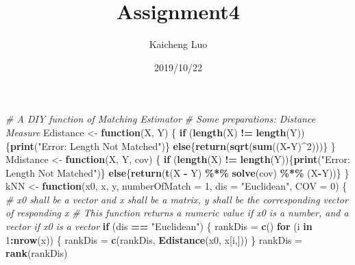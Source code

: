 \documentclass[]{article}
\title{Assignment4}
\author{Kaicheng Luo}
\date{2019/10/22}
\newenvironment{Shaded}{\begin{snugshade}}{\end{snugshade}}
\newcommand{\KeywordTok}[1]{\textcolor[rgb]{0.13,0.29,0.53}{\textbf{#1}}}
\newcommand{\DataTypeTok}[1]{\textcolor[rgb]{0.13,0.29,0.53}{#1}}
\newcommand{\DecValTok}[1]{\textcolor[rgb]{0.00,0.00,0.81}{#1}}
\newcommand{\StringTok}[1]{\textcolor[rgb]{0.31,0.60,0.02}{#1}}
\newcommand{\CommentTok}[1]{\textcolor[rgb]{0.56,0.35,0.01}{\textit{#1}}}
\newcommand{\ControlFlowTok}[1]{\textcolor[rgb]{0.13,0.29,0.53}{\textbf{#1}}}
\newcommand{\OperatorTok}[1]{\textcolor[rgb]{0.81,0.36,0.00}{\textbf{#1}}}
\newcommand{\NormalTok}[1]{#1}
\begin{document}
\maketitle

\begin{Shaded}
\begin{Highlighting}[]
\CommentTok{# A DIY function of Matching Estimator}
\CommentTok{# Some preparations: Distance Measure}
\NormalTok{Edistance <-}\StringTok{ }\ControlFlowTok{function}\NormalTok{(X, Y)}
\NormalTok{\{}
  \ControlFlowTok{if}\NormalTok{ (}\KeywordTok{length}\NormalTok{(X) }\OperatorTok{!=}\StringTok{ }\KeywordTok{length}\NormalTok{(Y))\{}\KeywordTok{print}\NormalTok{(}\StringTok{"Error: Length Not Matched"}\NormalTok{)\}}
  \ControlFlowTok{else}\NormalTok{\{}\KeywordTok{return}\NormalTok{(}\KeywordTok{sqrt}\NormalTok{(}\KeywordTok{sum}\NormalTok{((X}\OperatorTok{-}\NormalTok{Y)}\OperatorTok{^}\DecValTok{2}\NormalTok{)))\}}
\NormalTok{\}}
\NormalTok{Mdistance <-}\StringTok{ }\ControlFlowTok{function}\NormalTok{(X, Y, cov)}
\NormalTok{\{}
  \ControlFlowTok{if}\NormalTok{ (}\KeywordTok{length}\NormalTok{(X) }\OperatorTok{!=}\StringTok{ }\KeywordTok{length}\NormalTok{(Y))\{}\KeywordTok{print}\NormalTok{(}\StringTok{"Error: Length Not Matched"}\NormalTok{)\}}
  \ControlFlowTok{else}\NormalTok{\{}\KeywordTok{return}\NormalTok{(}\KeywordTok{t}\NormalTok{(X }\OperatorTok{-}\StringTok{ }\NormalTok{Y) }\OperatorTok{\%*\%}\StringTok{ }\KeywordTok{solve}\NormalTok{(cov) }\OperatorTok{\%*\%}\StringTok{ }\NormalTok{(X}\OperatorTok{-}\NormalTok{Y))\}}
\NormalTok{\}}
\NormalTok{kNN <-}\StringTok{ }\ControlFlowTok{function}\NormalTok{(x0, x, y, }\DataTypeTok{numberOfMatch =} \DecValTok{1}\NormalTok{, }\DataTypeTok{dis =} \StringTok{"Euclidean"}\NormalTok{, }\DataTypeTok{COV =} \DecValTok{0}\NormalTok{)}
\NormalTok{\{}
  \CommentTok{# x0 shall be a vector and x shall be a matrix, y shall be the corresponding vector of responding x}
  \CommentTok{# This function returns a numeric value if x0 is a number, and a vector if x0 is a vector}
  \ControlFlowTok{if}\NormalTok{ (dis }\OperatorTok{==}\StringTok{ "Euclidean"}\NormalTok{)}
\NormalTok{  \{}
\NormalTok{    rankDis =}\StringTok{ }\KeywordTok{c}\NormalTok{()}
    \ControlFlowTok{for}\NormalTok{ (i }\ControlFlowTok{in} \DecValTok{1}\OperatorTok{:}\KeywordTok{nrow}\NormalTok{(x))}
\NormalTok{    \{}
\NormalTok{      rankDis =}\StringTok{ }\KeywordTok{c}\NormalTok{(rankDis, }\KeywordTok{Edistance}\NormalTok{(x0, x[i,]))}
\NormalTok{    \}}
\NormalTok{    rankDis =}\StringTok{ }\KeywordTok{rank}\NormalTok{(rankDis)}

\end{Highlighting}
\end{Shaded}
\end{document}
